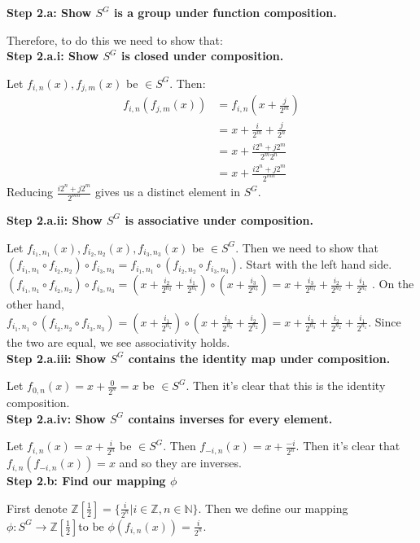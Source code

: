 \documentclass[12pt]{article}%
\newcommand{\N}{\mathbb{N}}
\newcommand{\Z}{\mathbb{Z}}
\begin{document}
\textbf{Step 2.a: Show $S^G$ is a group under function composition.}

Therefore, to do this we need to show that: \\

\textbf{Step 2.a.i: Show $S^G$ is closed under composition.}

Let $f_{i,n}(x), f_{j,m}(x)$ be $\in S^G$. Then: 
\begin{align*}
f_{i,n}(f_{j,m}(x))
&=f_{i,n}(x+\frac{j}{2^{m}}) \\
&=x+\frac{i}{2^{m}}+\frac{j}{2^{n}} \\
&=x+\frac{i2^{n}+j2^{m}}{2^{m}2^{n}} \\
&=x+\frac{i2^{n}+j2^{m}}{2^{mn}}
\end{align*}
Reducing $\frac{i2^{n}+j2^{m}}{2^{mn}}$ gives us a distinct element in $S^G$.

\textbf{Step 2.a.ii: Show $S^G$ is associative under composition.}

Let $f_{i_1,n_1}(x), f_{i_2,n_2}(x), f_{i_3,n_3}(x)$ be $\in S^G$. Then we need to show that  $(f_{i_1,n_1}\circ f_{i_2,n_2}) \circ f_{i_3,n_3}=f_{i_1,n_1}\circ (f_{i_2,n_2} \circ f_{i_3,n_3})$. Start with the left hand side. $(f_{i_1,n_1}\circ f_{i_2,n_2}) \circ f_{i_3,n_3} = (x+\frac{i_2}{2^{n_2}}+\frac{i_1}{2^{n_1}}) \circ (x+\frac{i_3}{2^{n_3}}) = x+\frac{i_3}{2^{n_3}}+\frac{i_2}{2^{n_2}}+\frac{i_1}{2^{n_1}}$ . On the other hand, $f_{i_1,n_1}\circ (f_{i_2,n_2} \circ f_{i_3,n_3})=(x+\frac{i_1}{2^{n_1}})\circ (x+\frac{i_3}{2^{n_3}}+\frac{i_2}{2^{n_2}})=x+\frac{i_3}{2^{n_3}}+\frac{i_2}{2^{n_2}}+\frac{i_1}{2^{n_1}}$. Since the two are equal, we see associativity holds. \\

\textbf{Step 2.a.iii: Show $S^G$ contains the identity map under composition.}

Let $f_{0,n}(x)=x+\frac{0}{2^n}=x$ be $\in S^G$.  Then it's clear that this is the identity composition. \\

\textbf{Step 2.a.iv: Show $S^G$ contains inverses for every element.}

Let $f_{i,n}(x)=x+\frac{i}{2^n}$ be $\in S^G$.  Then $f_{-i,n}(x)=x+\frac{-i}{2^n}$. Then it's clear that
$f_{i,n}(f_{-i,n}(x))=x$ and so they are inverses. \\

\textbf{Step 2.b: Find our mapping $\phi$}

First denote $\Z\left[\frac{1}{2}\right]=\{ \frac{i}{2^n} | i \in \Z, n \in \N \}$. Then we define our
mapping $\phi:S^G \rightarrow \Z\left[\frac{1}{2}\right]$to be $\phi(f_{i,n}(x))=\frac{i}{2^n}$. \\
\end{document}
